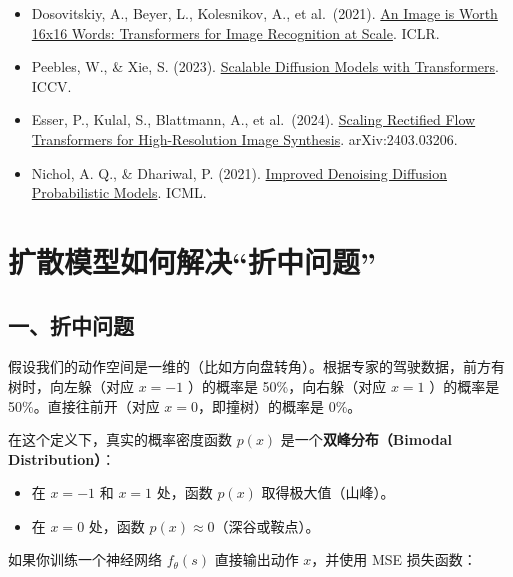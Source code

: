 \vspace{0.25em}
\begin{itemize}
\tightlist
\item
  Dosovitskiy, A., Beyer, L., Kolesnikov, A., et al.~(2021). \href{https://arxiv.org/abs/2010.11929}{An Image is Worth 16x16 Words: Transformers for Image Recognition at Scale}. ICLR.
\item
  Peebles, W., \& Xie, S. (2023). \href{https://arxiv.org/abs/2212.09748}{Scalable Diffusion Models with Transformers}. ICCV.
\item
  Esser, P., Kulal, S., Blattmann, A., et al.~(2024). \href{https://arxiv.org/abs/2403.03206}{Scaling Rectified Flow Transformers for High-Resolution Image Synthesis}. arXiv:2403.03206.
\item
  Nichol, A. Q., \& Dhariwal, P. (2021). \href{https://arxiv.org/abs/2102.09672}{Improved Denoising Diffusion Probabilistic Models}. ICML.
\end{itemize}

\clearpage

\hypertarget{ux6269ux6563ux6a21ux578bux5982ux4f55ux89e3ux51b3ux6298ux4e2dux95eeux9898}{%
\section{扩散模型如何解决``折中问题''}\label{ux6269ux6563ux6a21ux578bux5982ux4f55ux89e3ux51b3ux6298ux4e2dux95eeux9898}}

\hypertarget{ux4e00ux6298ux4e2dux95eeux9898}{%
\subsection{一、折中问题}\label{ux4e00ux6298ux4e2dux95eeux9898}}

假设我们的动作空间是一维的（比如方向盘转角）。根据专家的驾驶数据，前方有树时，向左躲（对应 \(x=-1\) ）的概率是 50\%，向右躲（对应 \(x=1\) ）的概率是 50\%。直接往前开（对应 \(x=0\)，即撞树）的概率是 0\%。

在这个定义下，真实的概率密度函数 \(p(x)\) 是一个\textbf{双峰分布（Bimodal Distribution）}：

\begin{itemize}
\tightlist
\item
  在 \(x=-1\) 和 \(x=1\) 处，函数 \(p(x)\) 取得极大值（山峰）。
\item
  在 \(x=0\) 处，函数 \(p(x)\approx 0\)（深谷或鞍点）。
\end{itemize}

如果你训练一个神经网络 \(f_\theta(s)\) 直接输出动作 \(x\)，并使用 MSE 损失函数：

